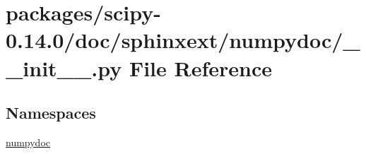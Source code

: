 \hypertarget{packages_2scipy-0_814_80_2doc_2sphinxext_2numpydoc_2____init_____8py}{}\section{packages/scipy-\/0.14.0/doc/sphinxext/numpydoc/\+\_\+\+\_\+init\+\_\+\+\_\+.py File Reference}
\label{packages_2scipy-0_814_80_2doc_2sphinxext_2numpydoc_2____init_____8py}
\subsection*{Namespaces}
\begin{DoxyCompactItemize}
\item 
 \hyperlink{namespacenumpydoc}{numpydoc}
\end{DoxyCompactItemize}
